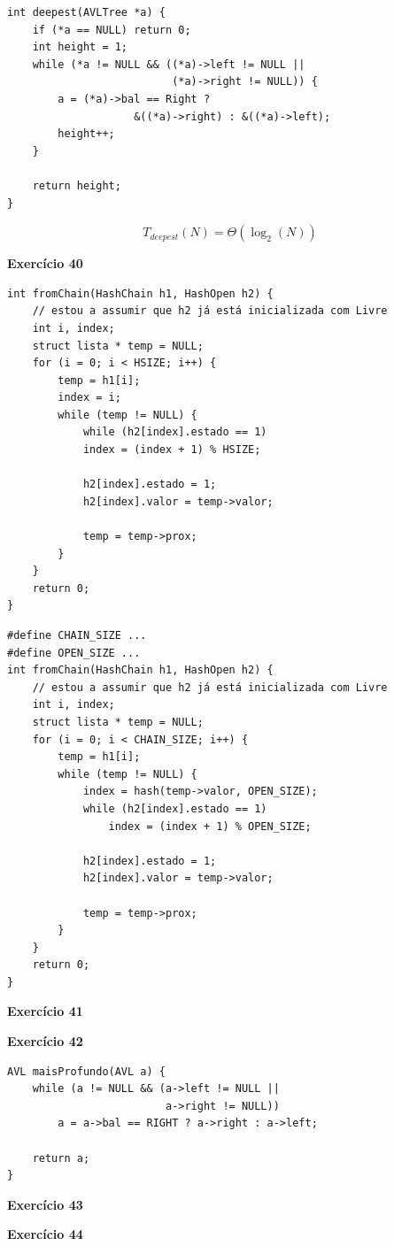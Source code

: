 \documentclass[a4paper,11pt]{article}
\begin{document}
\begin{verbatim}
int deepest(AVLTree *a) {
	if (*a == NULL) return 0; 
	int height = 1;
	while (*a != NULL && ((*a)->left != NULL || 
						  (*a)->right != NULL)) {
		a = (*a)->bal == Right ?
					&((*a)->right) : &((*a)->left);
		height++;
	}
		
	return height;
}
\end{verbatim}
\[
T_{deepest}(N) = \Theta(\log_2(N))
\]

\noindent \textbf{Exercício 40}

\begin{verbatim}
int fromChain(HashChain h1, HashOpen h2) {
	// estou a assumir que h2 já está inicializada com Livre
	int i, index;
	struct lista * temp = NULL;
	for (i = 0; i < HSIZE; i++) {
		temp = h1[i];
		index = i;
		while (temp != NULL) {
			while (h2[index].estado == 1)
			index = (index + 1) % HSIZE;
			
			h2[index].estado = 1;
			h2[index].valor = temp->valor;
			
			temp = temp->prox;
		}
	}
	return 0;
}
\end{verbatim}

\begin{verbatim}
#define CHAIN_SIZE ...
#define OPEN_SIZE ...
int fromChain(HashChain h1, HashOpen h2) {
	// estou a assumir que h2 já está inicializada com Livre
	int i, index;
	struct lista * temp = NULL;
	for (i = 0; i < CHAIN_SIZE; i++) {
		temp = h1[i];
		while (temp != NULL) {
			index = hash(temp->valor, OPEN_SIZE);
			while (h2[index].estado == 1)
				index = (index + 1) % OPEN_SIZE;
			
			h2[index].estado = 1;
			h2[index].valor = temp->valor;
			
			temp = temp->prox;
		}
	}
	return 0;
}
\end{verbatim}

\noindent \textbf{Exercício 41}


\noindent \textbf{Exercício 42}

\begin{verbatim}
AVL maisProfundo(AVL a) {
	while (a != NULL && (a->left != NULL || 
						 a->right != NULL))
		a = a->bal == RIGHT ? a->right : a->left;
	
	return a;
}
\end{verbatim}

\noindent \textbf{Exercício 43}


\noindent \textbf{Exercício 44}
\end{document}
